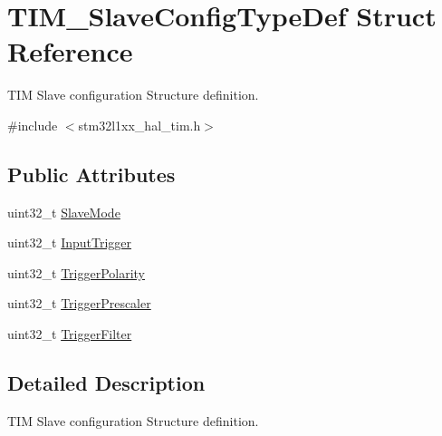 \hypertarget{struct_t_i_m___slave_config_type_def}{\section{T\-I\-M\-\_\-\-Slave\-Config\-Type\-Def Struct Reference}
\label{struct_t_i_m___slave_config_type_def}
}


T\-I\-M Slave configuration Structure definition.  




{\ttfamily \#include $<$stm32l1xx\-\_\-hal\-\_\-tim.\-h$>$}

\subsection*{Public Attributes}
\begin{DoxyCompactItemize}
\item 
uint32\-\_\-t \hyperlink{struct_t_i_m___slave_config_type_def_a2792de155698128ade1e505618c1bc43}{Slave\-Mode}
\item 
uint32\-\_\-t \hyperlink{struct_t_i_m___slave_config_type_def_a82efdad1e2ed9edbd4c895987ebfe0f7}{Input\-Trigger}
\item 
uint32\-\_\-t \hyperlink{struct_t_i_m___slave_config_type_def_afa8fa1801ef5e13115732a495ef11165}{Trigger\-Polarity}
\item 
uint32\-\_\-t \hyperlink{struct_t_i_m___slave_config_type_def_a57be6d41d77a968f1daeac7b65b1ab4c}{Trigger\-Prescaler}
\item 
uint32\-\_\-t \hyperlink{struct_t_i_m___slave_config_type_def_a07d28f704576a41e37bbb7412e0fba60}{Trigger\-Filter}
\end{DoxyCompactItemize}


\subsection{Detailed Description}
T\-I\-M Slave configuration Structure definition. 

